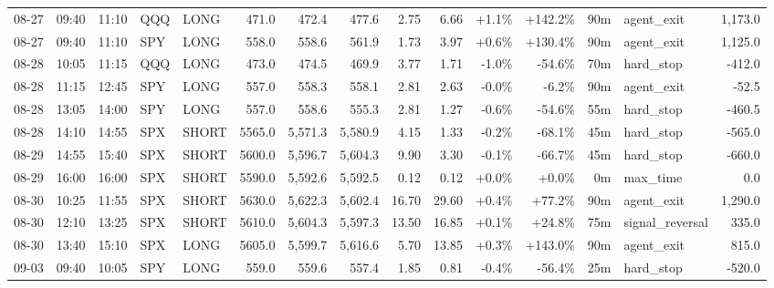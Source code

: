 \documentclass[11pt,a4paper,twoside]{article}
\begin{document}
\begin{landscape}
\begin{center}
\begin{longtable}{>{\color{txtmain}}l l l l l r r r r r r r r >{\color{txtmain}}l r}
08-27 & 09:40 & 11:10 & QQQ & LONG & 471.0 & 472.4 & 477.6 & 2.75 & 6.66 & \textcolor{wingreen}{+1.1\%} & \textcolor{wingreen}{+142.2\%} & 90m & agent\_exit & \textcolor{wingreen}{1,173.0} \\
08-27 & 09:40 & 11:10 & SPY & LONG & 558.0 & 558.6 & 561.9 & 1.73 & 3.97 & \textcolor{wingreen}{+0.6\%} & \textcolor{wingreen}{+130.4\%} & 90m & agent\_exit & \textcolor{wingreen}{1,125.0} \\
08-28 & 10:05 & 11:15 & QQQ & LONG & 473.0 & 474.5 & 469.9 & 3.77 & 1.71 & \textcolor{lossred}{-1.0\%} & \textcolor{lossred}{-54.6\%} & 70m & hard\_stop & \textcolor{lossred}{-412.0} \\
08-28 & 11:15 & 12:45 & SPY & LONG & 557.0 & 558.3 & 558.1 & 2.81 & 2.63 & \textcolor{lossred}{-0.0\%} & \textcolor{lossred}{-6.2\%} & 90m & agent\_exit & \textcolor{lossred}{-52.5} \\
08-28 & 13:05 & 14:00 & SPY & LONG & 557.0 & 558.6 & 555.3 & 2.81 & 1.27 & \textcolor{lossred}{-0.6\%} & \textcolor{lossred}{-54.6\%} & 55m & hard\_stop & \textcolor{lossred}{-460.5} \\
08-28 & 14:10 & 14:55 & SPX & SHORT & 5565.0 & 5,571.3 & 5,580.9 & 4.15 & 1.33 & \textcolor{lossred}{-0.2\%} & \textcolor{lossred}{-68.1\%} & 45m & hard\_stop & \textcolor{lossred}{-565.0} \\
08-29 & 14:55 & 15:40 & SPX & SHORT & 5600.0 & 5,596.7 & 5,604.3 & 9.90 & 3.30 & \textcolor{lossred}{-0.1\%} & \textcolor{lossred}{-66.7\%} & 45m & hard\_stop & \textcolor{lossred}{-660.0} \\
08-29 & 16:00 & 16:00 & SPX & SHORT & 5590.0 & 5,592.6 & 5,592.5 & 0.12 & 0.12 & \textcolor{wingreen}{+0.0\%} & \textcolor{wingreen}{+0.0\%} & 0m & max\_time & \textcolor{wingreen}{0.0} \\
08-30 & 10:25 & 11:55 & SPX & SHORT & 5630.0 & 5,622.3 & 5,602.4 & 16.70 & 29.60 & \textcolor{wingreen}{+0.4\%} & \textcolor{wingreen}{+77.2\%} & 90m & agent\_exit & \textcolor{wingreen}{1,290.0} \\
08-30 & 12:10 & 13:25 & SPX & SHORT & 5610.0 & 5,604.3 & 5,597.3 & 13.50 & 16.85 & \textcolor{wingreen}{+0.1\%} & \textcolor{wingreen}{+24.8\%} & 75m & signal\_reversal & \textcolor{wingreen}{335.0} \\
08-30 & 13:40 & 15:10 & SPX & LONG & 5605.0 & 5,599.7 & 5,616.6 & 5.70 & 13.85 & \textcolor{wingreen}{+0.3\%} & \textcolor{wingreen}{+143.0\%} & 90m & agent\_exit & \textcolor{wingreen}{815.0} \\
09-03 & 09:40 & 10:05 & SPY & LONG & 559.0 & 559.6 & 557.4 & 1.85 & 0.81 & \textcolor{lossred}{-0.4\%} & \textcolor{lossred}{-56.4\%} & 25m & hard\_stop & \textcolor{lossred}{-520.0} \\

\end{longtable}
\end{center}
\end{landscape}
\end{document}
